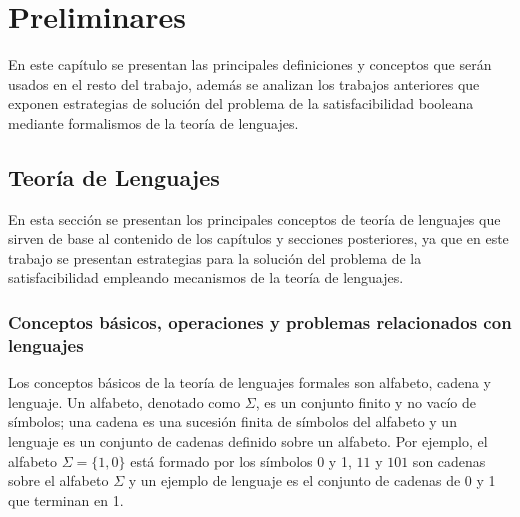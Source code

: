 
\chapter{Preliminares}
\label{chap:preliminaries}




En este capítulo se presentan las principales definiciones y conceptos que serán usados en el resto del trabajo, además
se analizan los trabajos anteriores que exponen estrategias de solución del problema de la satisfacibilidad
booleana  mediante formalismos de la teoría de lenguajes.

\section{Teoría de Lenguajes}

En esta sección se presentan los principales conceptos de teoría de lenguajes que sirven de base al contenido de los 
capítulos y secciones posteriores, ya que en este trabajo se presentan estrategias para la solución del problema
de la satisfacibilidad empleando mecanismos de la teoría de lenguajes.

\subsection{Conceptos básicos, operaciones y problemas relacionados con lenguajes}

Los conceptos básicos de la teoría de lenguajes formales son alfabeto, cadena y lenguaje. Un alfabeto, denotado 
como $\Sigma$, es un conjunto finito y no vacío de símbolos; una cadena es una sucesión finita de símbolos del alfabeto y 
un lenguaje es un conjunto de cadenas definido sobre un alfabeto. Por ejemplo, el 
alfabeto $\Sigma=\{1,0\}$ está formado por los símbolos 0 y 1, $11$ y $101$ son cadenas sobre el alfabeto $\Sigma$ y un ejemplo de lenguaje
es  el conjunto de cadenas de 0 y 1 que terminan en 1.

